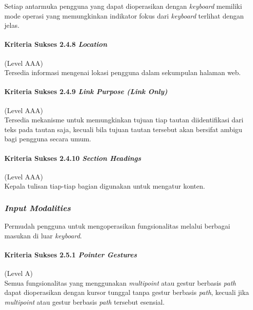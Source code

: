 \documentclass[a4paper,twoside]{article}
\begin{document}
\begin{enumerate}
		Setiap antarmuka pengguna yang dapat dioperasikan dengan \textit{keyboard} memiliki mode operasi yang memungkinkan indikator fokus dari \textit{keyboard} terlihat dengan jelas.

		\paragraph{Kriteria Sukses 2.4.8 \textit{Location}}
		\label{sec:kriteria_sukses_2.4.8}
		(Level AAA)\\

		Tersedia informasi mengenai lokasi pengguna dalam sekumpulan halaman web.

		\paragraph{Kriteria Sukses 2.4.9 \textit{Link Purpose (Link Only)}}
		\label{sec:kriteria_sukses_2.4.9}
		(Level AAA)\\

		Tersedia mekanisme untuk memungkinkan tujuan tiap tautan diidentifikasi dari teks pada tautan saja, kecuali bila tujuan tautan tersebut akan bersifat ambigu bagi pengguna secara umum.

		\paragraph{Kriteria Sukses 2.4.10 \textit{Section Headings}}
		\label{sec:kriteria_sukses_2.4.10}
		(Level AAA)\\

		Kepala tulisan tiap-tiap bagian digunakan untuk mengatur konten.

		\subsubsection*{\textit{Input Modalities}}
		\label{sec:input_modalities}
		Permudah pengguna untuk mengoperasikan fungsionalitas melalui berbagai masukan di luar \textit{keyboard}.

		\paragraph{Kriteria Sukses 2.5.1 \textit{Pointer Gestures}}
		\label{sec:kriteria_sukses_2.5.1}
		(Level A)\\

		Semua fungsionalitas yang menggunakan \textit{multipoint} atau gestur berbasis \textit{path} dapat dioperasikan dengan kursor tunggal tanpa gestur berbasis \textit{path}, kecuali jika \textit{multipoint} atau gestur berbasis \textit{path} tersebut esensial.


\end{enumerate}
\end{document}
